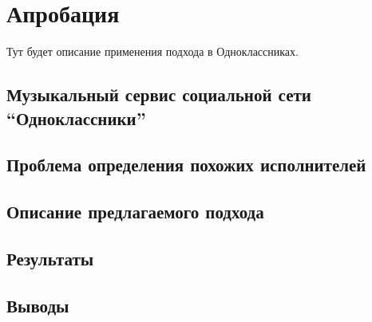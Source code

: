 \chapter{Апробация} 
\label{approbation}

Тут будет описание применения подхода в Одноклассниках.

\section{Музыкальный сервис социальной сети “Одноклассники”}
\section{Проблема определения похожих исполнителей}
\section{Описание предлагаемого подхода}
\section{Результаты}
\section{Выводы}
